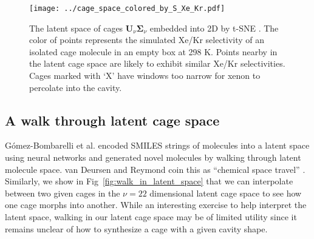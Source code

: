 \documentclass[journal=jacsat,manuscript=article,layout=traditional]{achemso}
\begin{document}
\begin{figure}
\centering
	\texttt{[image: ../cage\_space\_colored\_by\_S\_Xe\_Kr.pdf]}
	\caption{The latent space of cages $\mathbf{U}_\nu \mathbf{\Sigma}_\nu$ embedded into 2D by t-SNE \cite{maaten2008visualizing,wattenberg2016how}. The color of points represents the simulated Xe/Kr selectivity of an isolated cage molecule in an empty box at 298 K. Points nearby in the latent cage space are likely to exhibit similar Xe/Kr selectivities. Cages marked with `X' have windows too narrow for xenon to percolate into the cavity.
	} \label{fig:latent_space_S_Xe_Kr}
\end{figure}

\subsection{A walk through latent cage space}
\label{sec:latentwalk}
G\'{o}mez-Bombarelli et al. \cite{gomez2018automatic} encoded SMILES strings of molecules into a latent space using neural networks and generated novel molecules by walking through latent molecule space. van Deursen and Reymond coin this as ``chemical space travel'' \cite{van2007chemical}. Similarly, we show in Fig~\ref{fig:walk_in_latent_space} that we can interpolate between two given cages in the $\nu=22$ dimensional latent cage space to see how one cage morphs into another.
While an interesting exercise to help interpret the latent space, walking in our latent cage space may be of limited utility since it remains unclear of how to synthesize a cage with a given cavity shape.
\end{document}
